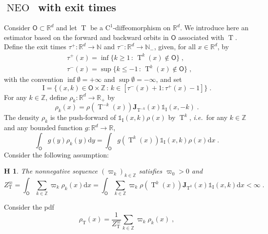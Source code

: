 \documentclass{article}
\newtheorem{assumption}{\textbf{H}\hspace{-3pt}}
\def\IFIS{\ensuremath{\operatorname{NEO}}}
\def\InFiNE{{\small \IFIS}}
\def\transfo{\operatorname{T}}
\def\rmd{\operatorname{d}\hspace{-2pt}}
\def\rset{\mathbb{R}}
\def\nset{\mathbb{N}}
\def\rmd{\mathrm{d}}
\def\eqsp{\,}
\def\ie{\textit{i.e.}}
\def\eqsp{\;}
\newcommand{\1}{\mathds{1}}
\newcommand{\indi}[1]{\1_{#1}}
\def\Jac{\mathbf{J}}
\newcommand{\JacOp}[1]{\Jac_{#1}}
\newcommand{\intentier}[2]{[#1:#2]}
\def\rmi{\mathrm{I}}
\def\const{Z}
\def\mso{\mathsf{O}}
\def\rset{\mathbb{R}}
\def\zset{\mathbb{Z}}
\def\nset{\mathbb{N}}
\def\rmd{\mathrm{d}}
\def\rmc{\mathrm{C}}
\def\rhoT{\rho_{\transfo}}
\def\constT{\const_{\transfo}}
\begin{document}
\subsection{\InFiNE\ with exit times}
\label{sec:infine_stopping_times}
Consider $\mso \subset \rset^d$ and let $\transfo$ be a $\rmc^1$-diffeomorphism on $\rset^d$. We introduce here an estimator based on the forward and backward orbits in $\mso$ associated with $\transfo$. Define the exit times
$\tau^{+} : \rset^d \to \nset$ and $\tau^{-} : \rset^d \to \nset_-$, given, for
all $x \in \rset^d$, by
\begin{align}
\label{eq:definition-tau-+--}
&\tau^{+}(x)=\inf\{k\geq 1\, :  \,  \transfo^{k}(x) \not \in \mso\} \eqsp, \\
&\tau^{-}(x)=\sup\{k\leq -1\, :  \,  \transfo^{k}(x) \not \in \mso\} \eqsp,
\end{align}
with the convention $\inf \emptyset = +\infty$ and
$\sup \emptyset = - \infty$, and set
\begin{equation}
  \label{eq:def_rmi}
  \rmi = \{(x,k) \in \mso\times \zset\,:\, k \in
\intentier{\tau^-(x)+1}{\tau^+(x)-1}\} \eqsp.
\end{equation}
For any $k \in \zset$, define $\rho_k : \rset^d \to \rset_+$ by
\begin{equation}
\label{eq:definition-rho-k}
    \rho_k(x)= \rho(\transfo^{-k}(x))
    \JacOp{\transfo^{-k}}(x) \indi{\rmi}(x,-k)\eqsp.
\end{equation}
The density $\rho_k$ is the push-forward
of $\indi{\rmi}(x,k)\rho({x})$ by $\transfo^{k}$, \ie~for any $k \in \zset$ and any bounded function $g:\rset^d \to \rset$,
\begin{equation}
    \label{eq:inf_non_eq_av_0}
    \int_\mso g(y)    \rho_k(y)\rmd y =
  \int_\mso g(\transfo^{k}(x)) \indi{\rmi}(x,k)\rho(x)\rmd x  \eqsp.
\end{equation}
Consider the following assumption:
\begin{assumption}
  \label{assumption:z_ne_finite}
  The nonnegative sequence $(\varpi_k)_{k\in\zset}$ satisfies $\varpi_0 > 0$ and
\begin{equation}
\label{eq:def_z_ne}
    \constT^\varpi = \int_\mso\sum_{k\in \zset}  \varpi_k \rho_k(x) \rmd x = \int_\mso\sum_{k\in \zset}  \varpi_k \rho(\transfo^k(x))  {\JacOp{\transfo^k}(x)} \1_{\rmi}(x,k) \rmd x< \infty\eqsp.
  \end{equation}
 \end{assumption}
Consider the pdf
\begin{equation}\label{eq:rhoT_stopping_times}
    \rhoT(x) =  \frac{1}{\constT^{\varpi}} \sum_{k \in\zset}\varpi_k \rho_k(x)\eqsp,
  \end{equation}
\end{document}
